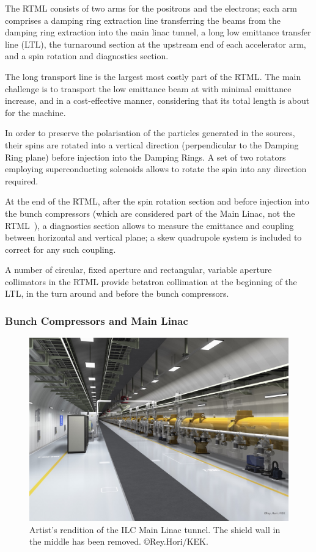 The RTML consists of two arms for the positrons and the electrons; 
each arm comprises a damping ring extraction line transferring the beams from the damping ring extraction into the main linac tunnel, a long low emittance transfer line (LTL), the turnaround section at the upstream end of each accelerator arm, and a spin rotation and diagnostics section.

The long transport line is the largest most costly part of the RTML.
The main challenge is to transport the low emittance beam at  with minimal emittance increase, and in a cost-effective manner, considering that its total length is about  for the  machine.

In order to preserve the polarisation of the particles generated in the sources, their spins are rotated into a vertical direction (perpendicular to the Damping Ring plane) before injection into the Damping Rings. 
A set of two rotators~\cite{Emma:1995kf} employing superconducting solenoids allows to rotate the spin into any direction required.

At the end of the RTML, after the spin rotation section and before injection into the bunch compressors (which are considered part of the Main Linac, not the RTML~\cite{bib:cr-0010}), a diagnostics section allows to measure the emittance and coupling between horizontal and vertical plane; 
a skew quadrupole system is included to correct for any such coupling.

A number of circular, fixed aperture and rectangular, variable aperture collimators in the RTML provide betatron collimation at the beginning of the LTL, in the turn around and before the bunch compressors.


\subsubsection{Bunch Compressors and Main Linac}

\begin{figure}[htbp]
   \includegraphics[width=\hsize]{chapters/figures/ILC2016_tunnel_A1_160826-low4}
\caption{Artist's rendition of the ILC Main Linac tunnel. The shield wall in the middle has been removed.
\copyright Rey.Hori/KEK.}
\label{fig:ilc-tunnel}
\end{figure}

